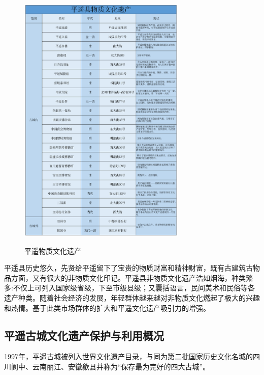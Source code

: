 \documentclass[UTF8]{ctexart}
\begin{document}
\begin{figure}
    \centering
    \caption{平遥物质文化遗产}
    \includegraphics[width=8cm]{物质文化遗产.png}
    \label{fig:my_label}
\end{figure}
平遥县历史悠久，先贤给平遥留下了宝贵的物质财富和精神财富，既有古建筑古物品方面，又有很大的非物质文化印记。平遥县非物质文化遗产浩如烟海，种类繁多:不仅上可列入国家级省级，下至市级县级；又囊括语言，民间美术和民俗等各遗产种类。随着社会经济的发展，年轻群体越来越对非物质文化燃起了极大的兴趣和热情。基于此类市场群体的扩大和平遥文化遗产吸引力的增强。
    \subsection{平遥古城文化遗产保护与利用概况}
1997年，平遥古城被列入世界文化遗产目录，与同为第二批国家历史文化名城的四川阆中、云南丽江、安徽歙县并称为“保存最为完好的四大古城”。
\end{document}
